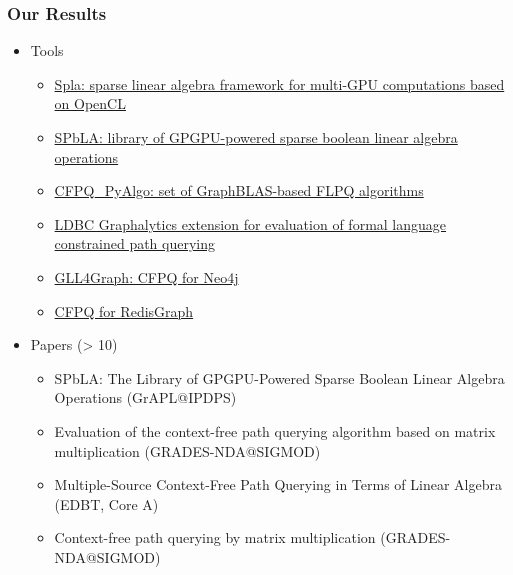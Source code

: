 \documentclass[xcolor=table,aspectratio=169]{beamer}
\begin{document}
\begin{frame}[fragile]
  \frametitle{Our Results}
    \begin{itemize}
      \item Tools
      \begin{itemize}
        \item \href{https://github.com/JetBrains-Research/spla}{Spla: sparse linear algebra framework for multi-GPU computations based on OpenCL}
        \item \href{https://github.com/JetBrains-Research/spbla}{SPbLA: library of GPGPU-powered sparse boolean linear algebra operations}    
        \pause
        \item \href{https://github.com/JetBrains-Research/CFPQ_PyAlgo}{CFPQ\_PyAlgo: set of GraphBLAS-based FLPQ algorithms}
        \item \href{https://github.com/JetBrains-Research/ldbc_graphalytics}{LDBC Graphalytics extension for evaluation of formal language constrained path querying}            
        \pause
        \item \href{https://github.com/JetBrains-Research/GLL4Graph}{GLL4Graph: CFPQ for Neo4j}
        \item \href{https://github.com/YaccConstructor/RedisGraph}{CFPQ for RedisGraph}
      \end{itemize}
      \pause
      \item Papers (> 10)
      \begin{itemize}
        \item SPbLA: The Library of GPGPU-Powered Sparse Boolean Linear Algebra Operations (GrAPL@IPDPS)
        \item Evaluation of the context-free path querying algorithm based on matrix multiplication (GRADES-NDA@SIGMOD)
        \item Multiple-Source Context-Free Path Querying in Terms of Linear Algebra (EDBT, Core A)
        \item Context-free path querying by matrix multiplication (GRADES-NDA@SIGMOD)
      \end{itemize} 
    \end{itemize}
\end{frame}
\end{document}
